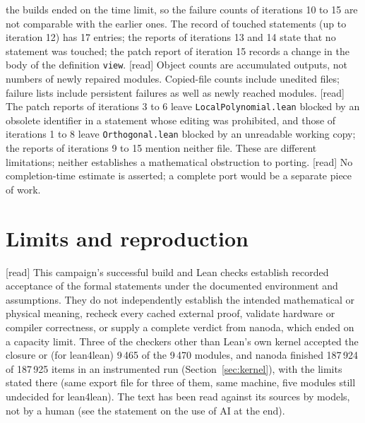 \documentclass[11pt,a4paper]{article}
\theoremstyle{plain}
\theoremstyle{definition}
\theoremstyle{remark}
\numberwithin{equation}{section}
\newcommand{\st}[1]{\textsf{[#1]}}
\begin{document}
the builds ended on the time limit, so the failure counts of iterations 10 to 15 are not comparable with the earlier ones. The record of
touched statements (up to iteration 12) has 17 entries; the reports of iterations 13 and 14 state that no statement was
touched; the patch report of iteration 15 records a change in the body of the definition \texttt{view}.
\st{read} Object counts are accumulated outputs, not numbers of newly repaired modules. Copied-file counts
include unedited files; failure lists include persistent failures as well as newly reached modules.
\st{read} The patch reports of iterations 3 to 6 leave \texttt{LocalPolynomial.lean} blocked by an obsolete identifier in a statement
whose editing was prohibited, and those of iterations 1 to 8 leave \texttt{Orthogonal.lean} blocked by an unreadable working copy; the reports of iterations 9 to 15 mention neither file.
These are different limitations; neither establishes a mathematical obstruction to porting.
\st{read} No completion-time estimate is asserted; a complete port would be a separate piece of work.

\section{Limits and reproduction}

\st{read} This campaign's successful build and Lean checks establish recorded acceptance of the formal statements
under the documented environment and assumptions. They do not independently establish the intended mathematical
or physical meaning, recheck every cached external proof, validate hardware or compiler correctness, or supply
a complete verdict from nanoda, which ended on a capacity limit. Three of the checkers other than Lean's own kernel accepted the closure or
(for lean4lean) 9\,465 of the 9\,470 modules, and nanoda finished 187\,924 of 187\,925 items in an instrumented run (Section~\ref{sec:kernel}), with the limits stated there (same export file for three of them, same machine,
five modules still undecided for lean4lean). The text has been read against its sources by models, not by a human (see the statement on the use of AI at the end).
\end{document}

